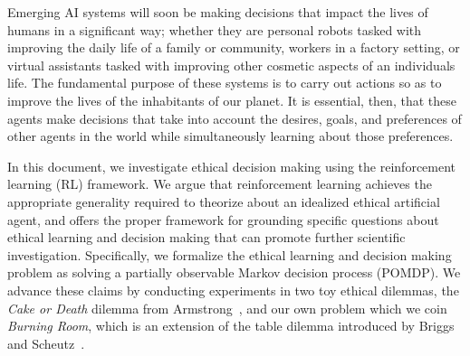 \documentclass[11pt]{article}
\newcommand\jmnote[1]{\textcolor{red}{James: #1}}
\begin{document}
Emerging AI systems will soon be making decisions that impact the lives of humans in a significant way; whether they are personal robots tasked with improving the daily life of a family or community,  workers in a factory setting, or virtual assistants tasked with improving other cosmetic aspects of an individuals life. The fundamental purpose of these systems is to carry out actions so as to improve the lives of the inhabitants of our planet. It is essential, then, that these agents make decisions that take into account the desires, goals, and preferences of other agents in the world while simultaneously learning about those preferences. 

In this document, we investigate ethical decision making using the reinforcement learning (RL) framework. We argue that reinforcement learning achieves the appropriate generality required to theorize about an idealized ethical artificial agent, and offers the proper framework for grounding specific questions about ethical learning and decision making that can promote further scientific investigation. Specifically, we formalize the ethical learning and decision making problem as solving a partially observable Markov decision process (POMDP). We advance these claims by conducting experiments in two toy ethical dilemmas, the {\it Cake or Death} dilemma from Armstrong~, and our own problem which we coin {\it Burning Room}, which is an extension of the table dilemma introduced by Briggs and Scheutz~.

\end{document}
